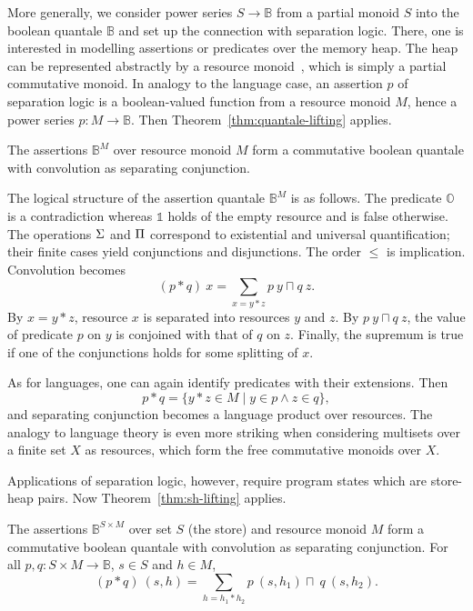 \documentclass[twoside,runningheads,envcountsame,envcountsect,oribibl,orivec]{llncs}
\def \unit {\mathbb{1}}
\def \zero {\mathbb{O}}
\begin{document}
More generally, we consider power series $S\to \mathbb{B}$ from a
partial monoid $S$ into the boolean quantale $\mathbb{B}$ and set up
the connection with separation logic. There, one is interested in
modelling assertions or predicates over the memory heap. 
The heap can be
represented abstractly by a resource monoid~\cite{COY07}, which is simply a
partial commutative monoid. In analogy to the
language case, an assertion $p$ of separation logic is a
boolean-valued function from a resource monoid $M$, hence a power
series $p:M\to\mathbb{B}$. Then Theorem~\ref{thm:quantale-lifting}
applies.
\begin{corollary}\label{cor:heap-ass-quantale}
  The assertions $\mathbb{B}^M$ over resource monoid $M$ form a 
  commutative boolean quantale with convolution as separating 
  conjunction. 
\end{corollary}
The logical structure of the assertion quantale $\mathbb{B}^M$ is as
follows. The predicate $\zero$ is a contradiction whereas $\unit$
holds of the empty resource and is false otherwise. The operations
${\rm \Sigma}$ and ${\rm \Pi}$ correspond to existential and universal
quantification; their finite cases yield conjunctions and
disjunctions. The order $\le$ is implication. Convolution becomes
\begin{equation*}
  (p\ast q)\ x=  \sum_{x=y\ast z} p\ y\sqcap q\ z.
\end{equation*}
By $x=y \ast z$, resource $x$ is separated into resources $y$ and
$z$. By $p\ y\sqcap q\ z$, the value of predicate $p$ on $y$ is
conjoined with that of $q$ on $z$. Finally, the supremum is true if
one of the conjunctions holds for some splitting of $x$.

As for languages, one can again identify predicates with their
extensions. Then
\begin{equation*}
  p\ast q = \{ y\ast z \in M\mid y\in p\wedge z\in q\},
\end{equation*}
and separating conjunction becomes a language product over
resources. The analogy to language theory is even more striking
when considering multisets over a finite set $X$ as resources, which
form the free commutative monoids over $X$.

Applications of separation logic, however, require program states
which are store-heap pairs.  Now Theorem~\ref{thm:sh-lifting} applies.
\begin{corollary}\label{cor:heap-ass-quantale}
  The assertions $\mathbb{B}^{S\times M}$ over set $S$ (the store) and
  resource monoid $M$ form a commutative boolean quantale with
  convolution as separating conjunction. For all $p,q:S\times M\to
  \mathbb{B}$, $s\in S$ and $h\in M$,
\begin{equation*}
    (p \ast q)\ (s,h) = \sum_{h=h_1\ast h_2} p\ (s,h_1)\sqcap\ q\ (s,h_2). 
\end{equation*}
\end{corollary}
\end{document}
